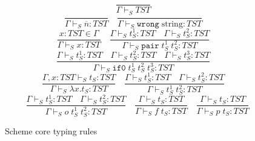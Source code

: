 \begin{figure}
\[
\frac{}{\Gamma\vdash_{S}TST}
\]
\bigskip
\[
\frac{}{\Gamma\vdash_{S}\overline{n}:TST}
\quad
\frac{}{\Gamma\vdash_{S}\mathtt{wrong}\;\mathrm{string}:TST}
\]
\[
\frac{x:TST\in\Gamma}{\Gamma\vdash_{S}x:TST}
\quad
\frac{\Gamma\vdash_{S}t_{S}^{1}:TST\quad\Gamma\vdash_{S}t_{S}^{2}:TST}{\Gamma\vdash_{S}\mathtt{pair}\;t_{S}^{1}\;t_{S}^{2}:TST}
\]
\[
\frac{\Gamma\vdash_{S}t_{S}^{1}:TST\quad\Gamma\vdash_{S}t_{S}^{2}:TST\quad\Gamma\vdash_{S}t_{S}^{3}:TST}{\Gamma\vdash_{S}\mathtt{if0}\;t_{S}^{1}\;t_{S}^{2}\;t_{S}^{3}:TST}
\]
\[
\frac{\Gamma,x:TST\vdash_{S}t_{S}:TST}{\Gamma\vdash_{S}\lambda x.t_{S}:TST}
\quad
\frac{\Gamma\vdash_{S}t_{S}^{1}:TST\quad\Gamma\vdash_{S}t_{S}^{2}:TST}{\Gamma\vdash_{S}t_{S}^{1}\;t_{S}^{2}:TST}
\]
\[
\quad
\frac{\Gamma\vdash_{S}t_{S}^{1}:TST\quad\Gamma\vdash_{S}t_{S}^{2}:TST}{\Gamma\vdash_{S}o\;t_{S}^{1}\;t_{S}^{2}:TST}
\quad
\frac{\Gamma\vdash_{S}t_{S}:TST}{\Gamma\vdash_{S}f\;t_{S}:TST}
\quad
\frac{\Gamma\vdash_{S}t_{S}:TST}{\Gamma\vdash_{S}p\;t_{S}:TST}
\]
\caption{Scheme core typing rules}
\label{sctr}
\end{figure}